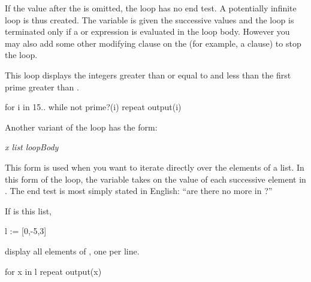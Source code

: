 {%

If the value after the 
is omitted, the loop has no end test.
A potentially infinite loop is thus created.
The variable is given the successive values 
and the loop is terminated only if a  or 
expression is evaluated in the loop body.
However you may also add some other modifying clause on the
 (for example, a  clause) to stop the loop.

\begin{xtc}
\begin{xtccomment}
This loop displays the integers greater than or equal to 
and less than the first prime greater than .
\end{xtccomment}
\begin{spadsrc}
for i in 15.. while not prime?(i) repeat output(i)
\end{spadsrc}
\end{xtc}


Another variant of the  loop has the form:
\begin{center}
{\it {} x  list  loopBody}
\end{center}
This form is used when you want to iterate directly over the
elements of a list.
In this form of the  loop, the variable
 takes on the value of each successive element in .
The end test is most simply stated in English: ``are there no more
 in ?''

\begin{xtc}
\begin{xtccomment}
If  is this list,
\end{xtccomment}
\begin{spadsrc}
l := [0,-5,3] 
\end{spadsrc}
\begin{TeXOutput}
\begin{fricasmath}{1}
%
\end{fricasmath}
\end{TeXOutput}
\end{xtc}
\begin{xtc}
\begin{xtccomment}
display all elements of , one per line.
\end{xtccomment}
\begin{spadsrc}
for x in l repeat output(x) 
\end{spadsrc}
\end{xtc}

}
